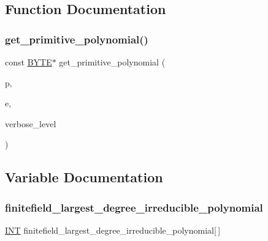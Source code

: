 \subsection{Function Documentation}
\mbox{\label{finite__field__tables_8_c_a208ece81c99403683f588d02defd74a7}} 
\subsubsection{\texorpdfstring{get\+\_\+primitive\+\_\+polynomial()}{get\_primitive\_polynomial()}}
{\footnotesize\ttfamily const \mbox{\hyperlink{galois_8h_ab6cc7b4aeb6ea31aba2b3fbfc83ff5e6}{B\+Y\+TE}}$\ast$ get\+\_\+primitive\+\_\+polynomial (\begin{DoxyParamCaption}\item[{\mbox{\hyperlink{galois_8h_a09fddde158a3a20bd2dcadb609de11dc}{I\+NT}}}]{p,  }\item[{\mbox{\hyperlink{galois_8h_a09fddde158a3a20bd2dcadb609de11dc}{I\+NT}}}]{e,  }\item[{\mbox{\hyperlink{galois_8h_a09fddde158a3a20bd2dcadb609de11dc}{I\+NT}}}]{verbose\+\_\+level }\end{DoxyParamCaption})}



\subsection{Variable Documentation}
\mbox{\label{finite__field__tables_8_c_a0e4aff37b507acf16f8e6461be1fac67}} 
\subsubsection{\texorpdfstring{finitefield\+\_\+largest\+\_\+degree\+\_\+irreducible\+\_\+polynomial}{finitefield\_largest\_degree\_irreducible\_polynomial}}
{\footnotesize\ttfamily \mbox{\hyperlink{galois_8h_a09fddde158a3a20bd2dcadb609de11dc}{I\+NT}} finitefield\+\_\+largest\+\_\+degree\+\_\+irreducible\+\_\+polynomial\mbox{[}$\,$\mbox{]}}

